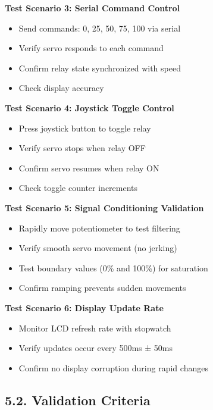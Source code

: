 \documentclass[12pt]{article}
\begin{document}
\textbf{Test Scenario 3: Serial Command Control}
\begin{itemize}
    \item Send commands: 0, 25, 50, 75, 100 via serial
    \item Verify servo responds to each command
    \item Confirm relay state synchronized with speed
    \item Check display accuracy
\end{itemize}

\textbf{Test Scenario 4: Joystick Toggle Control}
\begin{itemize}
    \item Press joystick button to toggle relay
    \item Verify servo stops when relay OFF
    \item Confirm servo resumes when relay ON
    \item Check toggle counter increments
\end{itemize}

\textbf{Test Scenario 5: Signal Conditioning Validation}
\begin{itemize}
    \item Rapidly move potentiometer to test filtering
    \item Verify smooth servo movement (no jerking)
    \item Test boundary values (0\% and 100\%) for saturation
    \item Confirm ramping prevents sudden movements
\end{itemize}

\textbf{Test Scenario 6: Display Update Rate}
\begin{itemize}
    \item Monitor LCD refresh rate with stopwatch
    \item Verify updates occur every 500ms ± 50ms
    \item Confirm no display corruption during rapid changes
\end{itemize}

\subsection*{5.2. Validation Criteria}
\end{document}
